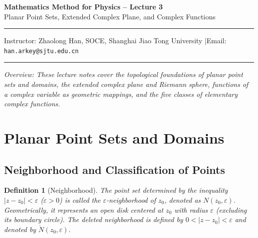 \documentclass[11pt,a4paper]{article}
\theoremstyle{definitionbreak}
\newtheorem{definition}{Definition}
\theoremstyle{examplebreak}
\theoremstyle{plain}
\begin{document}
\begin{center}
    {\LARGE \textbf{Mathematics Method for Physics -- Lecture 3}} \\[0.4em]
    {\large Planar Point Sets, Extended Complex Plane, and Complex Functions}
\end{center}

\vspace{-0.4em}
\noindent\rule{\textwidth}{0.6pt}
\vspace{0.1em}

\begin{center}
    Instructor: Zhaolong Han, SOCE, Shanghai Jiao Tong University \quad|\quad Email: \texttt{han.arkey@sjtu.edu.cn}
\end{center}

\vspace{0.1em}
\noindent\rule{\textwidth}{0.6pt}

\vspace{0.5em}
\noindent \textit{Overview: These lecture notes cover the topological foundations of planar point sets and domains, the extended complex plane and Riemann sphere, functions of a complex variable as geometric mappings, and the five classes of elementary complex functions.}

\vspace{0.8em}

\section{Planar Point Sets and Domains}

\subsection{Neighborhood and Classification of Points}

\begin{definition}[Neighborhood]
The point set determined by the inequality $|z - z_0| < \varepsilon$ ($\varepsilon > 0$) is called the $\varepsilon$-neighborhood of $z_0$, denoted as $N(z_0, \varepsilon)$. Geometrically, it represents an open disk centered at $z_0$ with radius $\varepsilon$ (excluding its boundary circle). The deleted neighborhood is defined by $0 < |z - z_0| < \varepsilon$ and denoted by $\mathring{N}(z_0, \varepsilon)$.
\end{definition}
\end{document}
